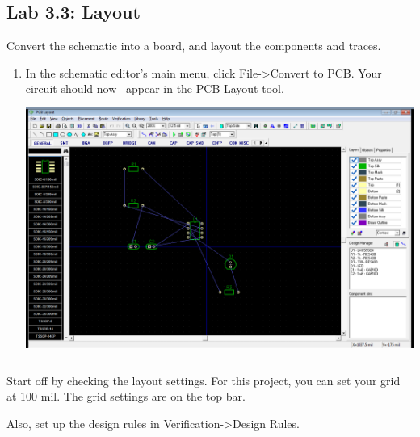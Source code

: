 \documentclass[letterpaper]{article}
\newcounter{saveenum}
\newcommand\liststyleRTFNumvi{%
\renewcommand\theenumi{\arabic{enumi}}
\renewcommand\theenumii{\alph{enumii}}
\renewcommand\theenumiii{\roman{enumiii}}
\renewcommand\theenumiv{\arabic{enumiv}}
\renewcommand\labelenumi{\theenumi.}
\renewcommand\labelenumii{\theenumii.}
\renewcommand\labelenumiii{\theenumiii.}
\renewcommand\labelenumiv{\theenumiv.}
}
\begin{document}
\subsection{Lab 3.3: Layout}
\hypertarget{Toc337742698}{}{\sffamily\color[rgb]{0.30980393,0.5058824,0.7411765}
Convert the schematic into a board, and layout the components and traces.}

\liststyleRTFNumvi
\setcounter{saveenum}{\value{enumi}}
\begin{enumerate}
\setcounter{enumi}{\value{saveenum}}
\item {\sffamily\color[rgb]{0.30980393,0.5058824,0.7411765}
In the schematic editor's main menu, click File-{\textgreater}Convert to PCB. Your circuit should now \ appear in the
PCB Layout tool.\newline
 \includegraphics[width=5.4in,height=3.3665in]{figures/ee4document-img022.png} }
\end{enumerate}
{\sffamily\color[rgb]{0.30980393,0.5058824,0.7411765}
Start off by checking the layout settings. For this project, you can set your grid at 100 mil. The grid settings are on
the top bar.}

{\sffamily\color[rgb]{0.30980393,0.5058824,0.7411765}
Also, set up the design rules in Verification-{\textgreater}Design Rules.}
\end{document}
